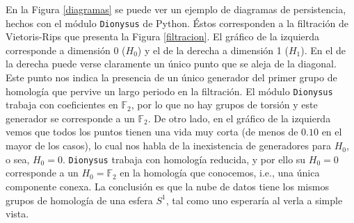 \documentclass[12pt,a4paper,twoside]{article} %
\theoremstyle{plain}
\theoremstyle{definition}
\newcommand{\F}{\mathbb{F}}
\begin{document}
En la Figura \ref{diagramas} se puede ver un ejemplo de diagramas de persistencia, hechos con el módulo \texttt{Dionysus} de Python. Éstos corresponden a la filtración de Vietoris-Rips que presenta la Figura \ref{filtracion}. El gráfico de la izquierda corresponde a dimensión 0 ($H_0$) y el de la derecha a dimensión 1 ($H_1$). En el de la derecha puede verse claramente un único punto que se aleja de la diagonal. Este punto nos indica la presencia de un único generador del primer grupo de homología que pervive un largo periodo en la filtración. El módulo \texttt{Dionysus} trabaja con coeficientes en $\F_2$, por lo que no hay grupos de torsión y este generador se corresponde a un $\F_2$.  De otro lado, en el gráfico de la izquierda vemos que todos los puntos tienen una vida muy corta (de menos de $0.10$ en el mayor de los casos), lo cual nos habla de la inexistencia de generadores para $H_0$, o sea, $H_0=0$. \texttt{Dionysus} trabaja con homología reducida, y por ello su $H_0=0$ corresponde a un $H_0=\F_2$ en la homología que conocemos, i.e., una única componente conexa. La conclusión es que la nube de datos tiene los mismos grupos de homología de una esfera $S^1$, tal como uno esperaría al verla a simple vista.
\end{document}
